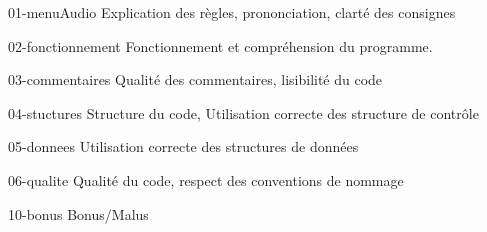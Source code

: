 {
    \begin{question}{01-menuAudio}
        Explication des règles, prononciation, clarté des consignes
    \end{question}

    \begin{question}{02-fonctionnement}
        Fonctionnement et compréhension du programme. 
    \end{question}

    \begin{question}{03-commentaires}
        Qualité des commentaires, lisibilité du code
    \end{question}

    \begin{question}{04-stuctures}
        Structure du code, Utilisation correcte des structure de contrôle
    \end{question}

    \begin{question}{05-donnees}
        Utilisation correcte des structures de données
    \end{question}

    \begin{question}{06-qualite}
        Qualité du code, respect des conventions de nommage
    \end{question}

    \begin{question}{10-bonus}
        Bonus/Malus
    \end{question}
}



